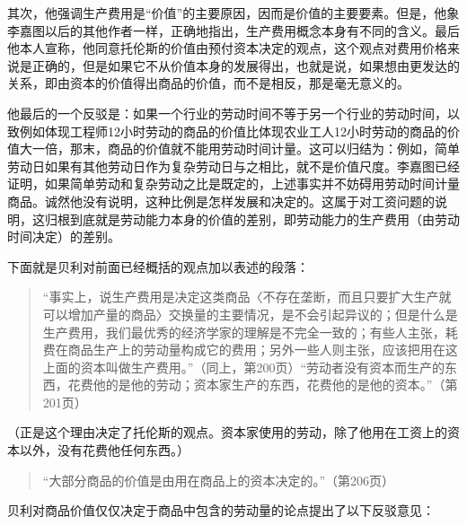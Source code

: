 其次，他强调生产费用是“价值”的主要原因，因而是价值的主要要素。但是，他象李嘉图以后的其他作者一样，正确地指出，生产费用概念本身有不同的含义。最后他本人宣称，他同意托伦斯的价值由预付资本决定的观点，这个观点对费用价格来说是正确的，但是如果它不从价值本身的发展得出，也就是说，如果想由更发达的关系，即由资本的价值得出商品的价值，而不是相反，那是毫无意义的。

他最后的一个反驳是：如果一个行业的劳动时间不等于另一个行业的劳动时间，以致例如体现工程师12小时劳动的商品的价值比体现农业工人12小时劳动的商品的价值大一倍，那末，商品的价值就不能用劳动时间计量。这可以归结为：例如，简单劳动日如果有其他劳动日作为复杂劳动日与之相比，就不是价值尺度。李嘉图已经证明，如果简单劳动和复杂劳动之比是既定的，上述事实并不妨碍用劳动时间计量商品。诚然他没有说明，这种比例是怎样发展和决定的。这属于对工资问题的说明，这归根到底就是劳动能力本身的价值的差别，即劳动能力的生产费用（由劳动时间决定）的差别。

下面就是贝利对前面已经概括的观点加以表述的段落：

\begin{quote}{“事实上，说生产费用是决定这类商品〈不存在垄断，而且只要扩大生产就可以增加产量的商品〉交换量的主要情况，是不会引起异议的；但是什么是生产费用，我们最优秀的经济学家的理解是不完全一致的；有些人主张，耗费在商品生产上的劳动量构成它的费用；另外一些人则主张，应该把用在这上面的资本叫做生产费用。”（同上，第200页）“劳动者没有资本而生产的东西，花费他的是他的劳动；资本家生产的东西，花费他的是他的资本。”（第201页）}\end{quote}

（正是这个理由决定了托伦斯的观点。资本家使用的劳动，除了他用在工资上的资本以外，没有花费他任何东西。）

\begin{quote}{“大部分商品的价值是由用在商品上的资本决定的。”（第206页）}\end{quote}

贝利对商品价值仅仅决定于商品中包含的劳动量的论点提出了以下反驳意见：

